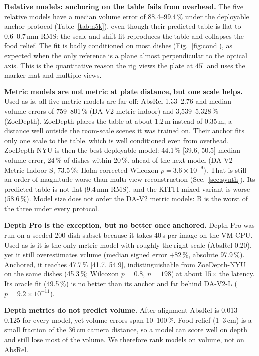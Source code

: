 \textbf{Relative models: anchoring on the table fails from overhead.} The five
relative models have a median volume error of 88.4--99.4\,\% under the
deployable anchor protocol (Table~\ref{tab:n5k}), even though their predicted
table is flat to 0.6--0.7\,mm RMS: the scale-and-shift fit reproduces the table
and collapses the food relief. The fit is badly conditioned on most dishes
(Fig.~\ref{fig:cond}), as expected when the only reference is a plane almost
perpendicular to the optical axis. This is the quantitative reason the rig
views the plate at $45^\circ$ and uses the marker mat and multiple views.

\textbf{Metric models are not metric at plate distance, but one scale helps.}
Used as-is, all five metric models are far off: AbsRel 1.33--2.76 and median
volume errors of 759--801\,\% (DA-V2 metric indoor) and 3{,}539--5{,}328\,\%
(ZoeDepth). ZoeDepth places the table at about 1.2\,m instead of 0.35\,m, a
distance well outside the room-scale scenes it was trained on. Their anchor
fits only one scale to the table, which is well conditioned even from
overhead. ZoeDepth-NYU is then the best deployable model: 44.1\,\% [39.6,
50.5] median volume error, 24\,\% of dishes within 20\,\%, ahead of the next
model (DA-V2-Metric-Indoor-S, 73.5\,\%; Holm-corrected Wilcoxon
$p=3.6\times10^{-9}$). That is still an order of magnitude worse than
multi-view reconstruction (Sec.~\ref{sec:synth}). Its predicted table is not
flat (9.4\,mm RMS), and the KITTI-mixed variant is worse (58.6\,\%). Model size
does not order the DA-V2 metric models: B is the worst of the three under
every protocol.

\textbf{Depth Pro is the exception, but no better once anchored.} Depth Pro
was run on a seeded 200-dish subset because it takes 40\,s per image on the
VM CPU. Used as-is it is the only metric model with roughly the right scale
(AbsRel 0.20), yet it still overestimates volume (median signed error
$+82$\,\%, absolute 97.9\,\%). Anchored, it reaches 47.7\,\% [41.7, 54.9],
indistinguishable from ZoeDepth-NYU on the same dishes (45.3\,\%;
Wilcoxon $p=0.8$, $n=198$) at about 15$\times$ the latency. Its oracle fit
(49.5\,\%) is no better than its anchor and far behind DA-V2-L
($p=9.2\times10^{-11}$).

\textbf{Depth metrics do not predict volume.} After alignment AbsRel is
0.013--0.125 for every model, yet volume errors span 10--100\,\%. Food relief
(1--3\,cm) is a small fraction of the 36\,cm camera distance, so a model can
score well on depth and still lose most of the volume. We therefore rank
models on volume, not on AbsRel.

